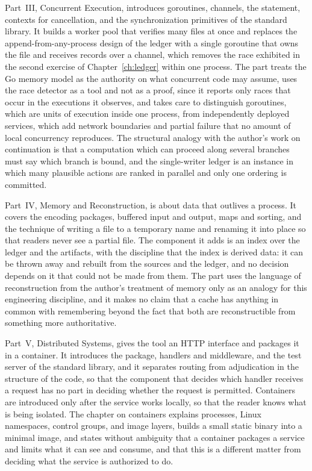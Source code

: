 Part~III, Concurrent Execution, introduces goroutines, channels, the  statement, contexts for cancellation, and the synchronization primitives of the standard library. It builds a worker pool that verifies many files at once and replaces the append-from-any-process design of the ledger with a single goroutine that owns the file and receives records over a channel, which removes the race exhibited in the second exercise of Chapter~\ref{ch:ledger} within one process. The part treats the Go memory model as the authority on what concurrent code may assume, uses the race detector as a tool and not as a proof, since it reports only races that occur in the executions it observes, and takes care to distinguish goroutines, which are units of execution inside one process, from independently deployed services, which add network boundaries and partial failure that no amount of local concurrency reproduces. The structural analogy with the author's work on continuation is that a computation which can proceed along several branches must say which branch is bound, and the single-writer ledger is an instance in which many plausible actions are ranked in parallel and only one ordering is committed.

Part~IV, Memory and Reconstruction, is about data that outlives a process. It covers the encoding packages, buffered input and output, maps and sorting, and the technique of writing a file to a temporary name and renaming it into place so that readers never see a partial file. The component it adds is an index over the ledger and the artifacts, with the discipline that the index is derived data: it can be thrown away and rebuilt from the sources and the ledger, and no decision depends on it that could not be made from them. The part uses the language of reconstruction from the author's treatment of memory only as an analogy for this engineering discipline, and it makes no claim that a cache has anything in common with remembering beyond the fact that both are reconstructible from something more authoritative.

Part~V, Distributed Systems, gives the tool an HTTP interface and packages it in a container. It introduces the  package, handlers and middleware, and the test server of the standard library, and it separates routing from adjudication in the structure of the code, so that the component that decides which handler receives a request has no part in deciding whether the request is permitted. Containers are introduced only after the service works locally, so that the reader knows what is being isolated. The chapter on containers explains processes, Linux namespaces, control groups, and image layers, builds a small static binary into a minimal image, and states without ambiguity that a container packages a service and limits what it can see and consume, and that this is a different matter from deciding what the service is authorized to do.

